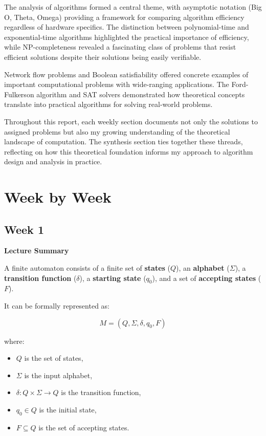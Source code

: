 \documentclass{article}
\theoremstyle{theorem}
\theoremstyle{definition}
\theoremstyle{remark}
\begin{document}
The analysis of algorithms formed a central theme, with asymptotic notation (Big O, Theta, Omega) providing a framework for comparing algorithm efficiency regardless of hardware specifics. The distinction between polynomial-time and exponential-time algorithms highlighted the practical importance of efficiency, while NP-completeness revealed a fascinating class of problems that resist efficient solutions despite their solutions being easily verifiable.

Network flow problems and Boolean satisfiability offered concrete examples of important computational problems with wide-ranging applications. The Ford-Fulkerson algorithm and SAT solvers demonstrated how theoretical concepts translate into practical algorithms for solving real-world problems.

Throughout this report, each weekly section documents not only the solutions to assigned problems but also my growing understanding of the theoretical landscape of computation. The synthesis section ties together these threads, reflecting on how this theoretical foundation informs my approach to algorithm design and analysis in practice.

\section{Week by Week}\label{homework}


\subsection{Week 1}
\textbf{Lecture Summary}

A finite automaton consists of a finite set of \textbf{states} ($Q$), an \textbf{alphabet} ($\Sigma$), a \textbf{transition function} ($\delta$), a \textbf{starting state} ($q_0$), and a set of \textbf{accepting states} ($F$). 

It can be formally represented as:

\[
M = (Q, \Sigma, \delta, q_0, F)
\]

where:
\begin{itemize}
    \item $Q$ is the set of states,
    \item $\Sigma$ is the input alphabet,
    \item $\delta: Q \times \Sigma \to Q$ is the transition function,
    \item $q_0 \in Q$ is the initial state,
    \item $F \subseteq Q$ is the set of accepting states.
\end{itemize}
\end{document}

